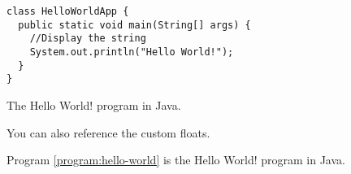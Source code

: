 \begin{frame}[fragile]

\begin{program}[H]
  \begin{verbatim}
class HelloWorldApp {
  public static void main(String[] args) {
    //Display the string
    System.out.println("Hello World!");
  }
}
  \end{verbatim}
  \caption{The Hello World! program in Java.}
  \label{program:hello-world}
\end{program}

You can also reference the custom floats.

\begin{latexexample}
Program \ref{program:hello-world} is the Hello World! program in Java.
\end{latexexample}

\end{frame}

